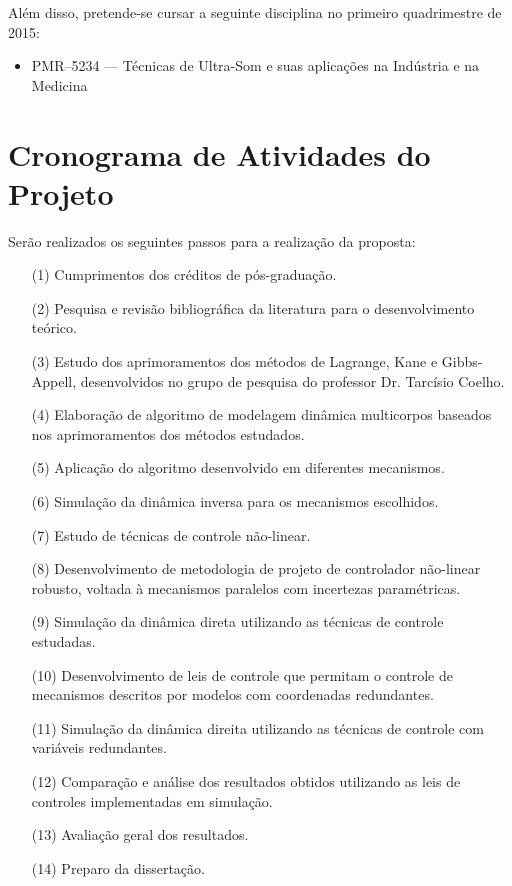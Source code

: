 \documentclass[a4paper,11pt,brazil,fleqn]{article}
\begin{document}
Al\'em disso, pretende-se cursar a seguinte disciplina no primeiro quadrimestre de 2015:
\begin{itemize}
\item PMR--5234 --- T\'ecnicas de Ultra-Som e suas aplica\c{c}\~oes na Ind\'ustria e na Medicina
\end{itemize}

\section{Cronograma de Atividades do Projeto}\label{S07}

Ser\~ao realizados os seguintes passos para a realiza\c{c}\~ao da proposta:

\begin{itemize}
\item[(1)] 	Cumprimentos dos cr\'editos de p\'os-gradua\c{c}\~ao.
\item[(2)] 	Pesquisa e revis\~ao bibliogr\'afica da literatura para o desenvolvimento te\'orico.
\item[(3)] 	Estudo dos aprimoramentos dos m\'etodos de Lagrange, Kane e Gibbs-Appell, desenvolvidos no grupo de pesquisa do professor Dr. Tarc\'isio Coelho.
\item[(4)]  Elabora\c{c}\~ao de algoritmo de modelagem din\^amica multicorpos baseados nos aprimoramentos dos m\'etodos estudados.
\item[(5)] 	Aplica\c{c}\~ao do algoritmo desenvolvido em diferentes mecanismos.
\item[(6)] 	Simula\c{c}\~ao da din\^amica inversa para os mecanismos escolhidos.
\item[(7)]  Estudo de t\'ecnicas de controle n\~ao-linear.
\item[(8)]  Desenvolvimento de metodologia de projeto de controlador n\~ao-linear robusto, voltada \`a mecanismos paralelos com incertezas param\'etricas.
\item[(9)] 	Simula\c{c}\~ao da din\^amica direta utilizando as t\'ecnicas de controle estudadas.
\item[(10)] 	Desenvolvimento de leis de controle que permitam  o controle de mecanismos descritos por modelos  com coordenadas redundantes.
\item[(11)] Simula\c{c}\~ao da din\^amica direita utilizando as t\'ecnicas de controle com vari\'aveis redundantes.
\item[(12)] 	Compara\c{c}\~ao e an\'alise dos resultados obtidos utilizando as leis de controles implementadas em simula\c{c}\~ao.
\item[(13)] 	Avalia\c{c}\~ao geral dos resultados.
\item[(14)] Preparo da disserta\c{c}\~ao.
\end{itemize}
\end{document}
